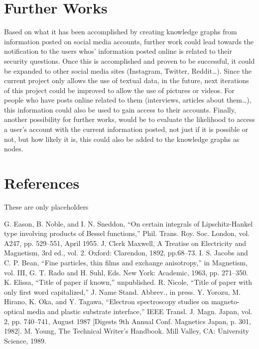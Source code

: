 \documentclass[conference]{IEEEtran}
\begin{document}
\section{Further Works}
Based on what it has been accomplished by creating knowledge graphs from information posted on social media accounts, further work could lead towards the notification to the users whos’ information posted online is related to their security questions. Once this is accomplished and proven to be successful, it could be expanded to other social media sites (Instagram, Twitter, Reddit…). 
	Since the current project only allows the use of textual data, in the future, next iterations of this project could be improved to allow the use of pictures or videos. For people who have posts online related to them (interviews, articles about them…), this information could also be used to gain access to their accounts. 
	Finally, another possibility for further works, would be to evaluate the likelihood to access a user’s account with the current information posted, not just if it is possible or not, but how likely it is, this could also be added to the knowledge graphs as nodes.


\section{References}

These are only placeholders

\begin{thebibliography}{00}
 G. Eason, B. Noble, and I. N. Sneddon, ``On certain integrals of Lipschitz-Hankel type involving products of Bessel functions,'' Phil. Trans. Roy. Soc. London, vol. A247, pp. 529--551, April 1955.
 J. Clerk Maxwell, A Treatise on Electricity and Magnetism, 3rd ed., vol. 2. Oxford: Clarendon, 1892, pp.68--73.
 I. S. Jacobs and C. P. Bean, ``Fine particles, thin films and exchange anisotropy,'' in Magnetism, vol. III, G. T. Rado and H. Suhl, Eds. New York: Academic, 1963, pp. 271--350.
 K. Elissa, ``Title of paper if known,'' unpublished.
 R. Nicole, ``Title of paper with only first word capitalized,'' J. Name Stand. Abbrev., in press.
 Y. Yorozu, M. Hirano, K. Oka, and Y. Tagawa, ``Electron spectroscopy studies on magneto-optical media and plastic substrate interface,'' IEEE Transl. J. Magn. Japan, vol. 2, pp. 740--741, August 1987 [Digests 9th Annual Conf. Magnetics Japan, p. 301, 1982].
 M. Young, The Technical Writer's Handbook. Mill Valley, CA: University Science, 1989.
\end{thebibliography}
\vspace{12pt}
\end{document}

